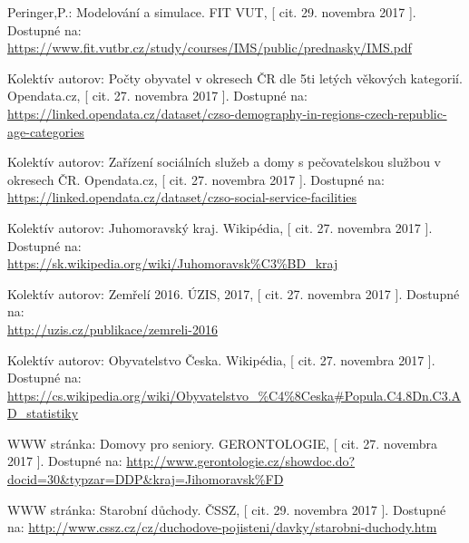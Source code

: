 \documentclass[a4paper, 11pt]{article}
\begin{document}
\renewcommand\refname{Odkazy}
\begin{thebibliography}{9}
 Peringer,P.: Modelování a simulace. FIT VUT, [ cit. 29. novembra 2017 ]. Dostupné na: \\\url{https://www.fit.vutbr.cz/study/courses/IMS/public/prednasky/IMS.pdf}

 Kolektív autorov: Počty obyvatel v okresech ČR dle 5ti letých věkových kategorií. Opendata.cz, [ cit. 27. novembra 2017 ]. Dostupné na: \\\url{https://linked.opendata.cz/dataset/czso-demography-in-regions-czech-republic-age-categories}

 Kolektív autorov: Zařízení sociálních služeb a domy s pečovatelskou službou v okresech ČR. Opendata.cz, [ cit. 27. novembra 2017 ]. Dostupné na: \\\url{https://linked.opendata.cz/dataset/czso-social-service-facilities}

 Kolektív autorov: Juhomoravský kraj. Wikipédia, [ cit. 27. novembra 2017 ]. Dostupné na: \\\url{https://sk.wikipedia.org/wiki/Juhomoravsk%C3%BD_kraj}

 Kolektív autorov: Zemřelí 2016. ÚZIS, 2017, [ cit. 27. novembra 2017 ]. Dostupné na:
\\\url{http://uzis.cz/publikace/zemreli-2016}

 Kolektív autorov: Obyvatelstvo Česka. Wikipédia, [ cit. 27. novembra 2017 ]. Dostupné na:\\\url{https://cs.wikipedia.org/wiki/Obyvatelstvo_%C4%8Ceska#Popula.C4.8Dn.C3.AD_statistiky}

 WWW stránka: Domovy pro seniory. GERONTOLOGIE, [ cit. 27. novembra 2017 ]. Dostupné na: 
\url{http://www.gerontologie.cz/showdoc.do?docid=30&typzar=DDP&kraj=Jihomoravsk%FD}

 WWW stránka: Starobní důchody. ČSSZ, [ cit. 29. novembra 2017 ]. Dostupné na: 
\url{http://www.cssz.cz/cz/duchodove-pojisteni/davky/starobni-duchody.htm}


\end{thebibliography}
\end{document}
